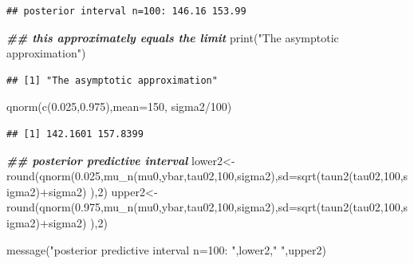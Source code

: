 \documentclass[
]{book}
\newenvironment{Shaded}{\begin{snugshade}}{\end{snugshade}}
\newcommand{\AttributeTok}[1]{\textcolor[rgb]{0.77,0.63,0.00}{#1}}
\newcommand{\DecValTok}[1]{\textcolor[rgb]{0.00,0.00,0.81}{#1}}
\newcommand{\DocumentationTok}[1]{\textcolor[rgb]{0.56,0.35,0.01}{\textbf{\textit{#1}}}}
\newcommand{\FloatTok}[1]{\textcolor[rgb]{0.00,0.00,0.81}{#1}}
\newcommand{\FunctionTok}[1]{\textcolor[rgb]{0.00,0.00,0.00}{#1}}
\newcommand{\NormalTok}[1]{#1}
\newcommand{\OtherTok}[1]{\textcolor[rgb]{0.56,0.35,0.01}{#1}}
\newcommand{\SpecialCharTok}[1]{\textcolor[rgb]{0.00,0.00,0.00}{#1}}
\newcommand{\StringTok}[1]{\textcolor[rgb]{0.31,0.60,0.02}{#1}}
\theoremstyle{definition}
\theoremstyle{definition}
\theoremstyle{definition}
\theoremstyle{definition}
\theoremstyle{remark}
\begin{document}
\begin{verbatim}
## posterior interval n=100: 146.16 153.99
\end{verbatim}

\begin{Shaded}
\begin{Highlighting}[]
 \DocumentationTok{\#\# this approximately equals the limit}
\FunctionTok{print}\NormalTok{(}\StringTok{"The asymptotic approximation"}\NormalTok{)}
\end{Highlighting}
\end{Shaded}

\begin{verbatim}
## [1] "The asymptotic approximation"
\end{verbatim}

\begin{Shaded}
\begin{Highlighting}[]
 \FunctionTok{qnorm}\NormalTok{(}\FunctionTok{c}\NormalTok{(}\FloatTok{0.025}\NormalTok{,}\FloatTok{0.975}\NormalTok{),}\AttributeTok{mean=}\DecValTok{150}\NormalTok{, sigma2}\SpecialCharTok{/}\DecValTok{100}\NormalTok{)}
\end{Highlighting}
\end{Shaded}

\begin{verbatim}
## [1] 142.1601 157.8399
\end{verbatim}

\begin{Shaded}
\begin{Highlighting}[]
\DocumentationTok{\#\# posterior predictive interval}
\NormalTok{ lower2}\OtherTok{\textless{}{-}}\FunctionTok{round}\NormalTok{(}\FunctionTok{qnorm}\NormalTok{(}\FloatTok{0.025}\NormalTok{,}\FunctionTok{mu\_n}\NormalTok{(mu0,ybar,tau02,}\DecValTok{100}\NormalTok{,sigma2),}\AttributeTok{sd=}\FunctionTok{sqrt}\NormalTok{(}\FunctionTok{taun2}\NormalTok{(tau02,}\DecValTok{100}\NormalTok{,sigma2)}\SpecialCharTok{+}\NormalTok{sigma2) ),}\DecValTok{2}\NormalTok{)}
\NormalTok{    upper2}\OtherTok{\textless{}{-}}\FunctionTok{round}\NormalTok{(}\FunctionTok{qnorm}\NormalTok{(}\FloatTok{0.975}\NormalTok{,}\FunctionTok{mu\_n}\NormalTok{(mu0,ybar,tau02,}\DecValTok{100}\NormalTok{,sigma2),}\AttributeTok{sd=}\FunctionTok{sqrt}\NormalTok{(}\FunctionTok{taun2}\NormalTok{(tau02,}\DecValTok{100}\NormalTok{,sigma2)}\SpecialCharTok{+}\NormalTok{sigma2) ),}\DecValTok{2}\NormalTok{)}

\FunctionTok{message}\NormalTok{(}\StringTok{"posterior predictive interval n=100: "}\NormalTok{,lower2,}\StringTok{" "}\NormalTok{,upper2)}
\end{Highlighting}
\end{Shaded}
\end{document}

